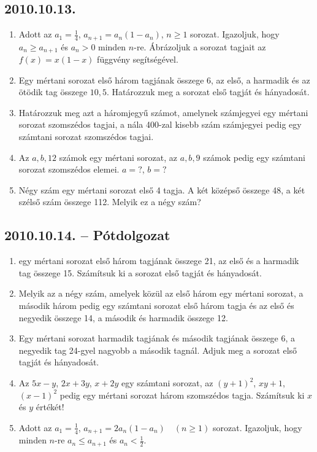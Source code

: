 \subsection*{2010.10.13.}
\begin{enumerate}
\item Adott az $a_1=\frac{1}{4}$, $a_{n+1}=a_n(1-a_n)$, $n\ge 1$ sorozat. Igazoljuk, hogy $a_n\ge a_{n+1}$ és $a_n>0$ minden $n$-re. Ábrázoljuk a sorozat tagjait az $f(x)=x(1-x)$ függvény segítségével.
\item Egy mértani sorozat első három tagjának összege 6, az első, a harmadik és az ötödik tag összege $10{,}5$. Határozzuk meg a sorozat első tagját és hányadosát.
\item Határozzuk meg azt a háromjegyű számot, amelynek számjegyei egy mértani sorozat szomszédos tagjai, a nála 400-zal kisebb szám számjegyei pedig egy számtani sorozat szomszédos tagjai.
\item Az $a,b,12$ számok egy mértani sorozat, az $a,b,9$ számok pedig egy számtani sorozat szomszédos elemei. $a=?$, $b=?$
\item Négy szám egy mértani sorozat első 4 tagja.
A két középső összege 48, a két szélső szám összege 112. Melyik ez a négy szám?
\end{enumerate}


\subsection*{2010.10.14. -- Pótdolgozat}
\begin{enumerate}
\item egy mértani sorozat első három tagjának összege 21, az első és a harmadik tag összege 15. Számítsuk ki a sorozat első tagját és hányadosát.
\item Melyik az a négy szám, amelyek közül az első három egy mértani sorozat, a második három pedig egy számtani sorozat első három tagja és az első és negyedik összege 14, a második és harmadik összege 12.
\item Egy mértani sorozat harmadik tagjának és második tagjának összege 6, a negyedik tag 24-gyel nagyobb a második tagnál. Adjuk meg a sorozat első tagját és hányadosát.
\item Az $5x-y$, $2x+3y$, $x+2y$ egy számtani sorozat, az $(y+1)^2$, $xy+1$, $(x-1)^2$ pedig egy mértani sorozat három szomszédos tagja. Számítsuk ki $x$ és $y$ értékét!
\item Adott az $a_1=\frac{1}{4}$, $a_{n+1}=2a_n(1-a_n)\quad (n\ge 1)$ sorozat. Igazoljuk, hogy minden $n$-re $a_n\le a_{n+1}$ és $a_n<\frac{1}{2}$.
\end{enumerate}




